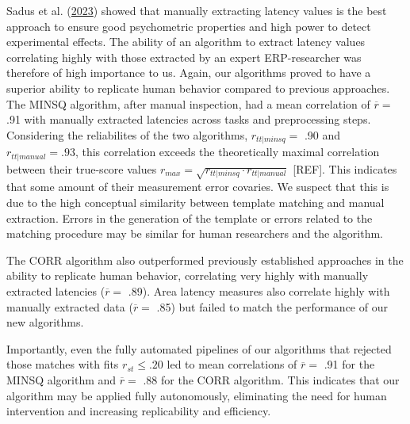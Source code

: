 \documentclass[
  man]{apa7}
\begin{document}
Sadus et al. (\protect\hyperlink{ref-sadus2023multiverse}{2023}) showed that manually extracting latency values is the best approach to ensure good psychometric properties and high power to detect experimental effects. The ability of an algorithm to extract latency values correlating highly with those extracted by an expert ERP-researcher was therefore of high importance to us.
Again, our algorithms proved to have a superior ability to replicate human behavior compared to previous approaches. The MINSQ algorithm, after manual inspection, had a mean correlation of \(\overline{r} =\) .91 with manually extracted latencies across tasks and preprocessing steps. Considering the reliabilites of the two algorithms, \(r_{tt|minsq} =\) .90 and \(r_{tt|manual} = .93\), this correlation exceeds the theoretically maximal correlation between their true-score values \(r_{max} = \sqrt{r_{tt|minsq} \cdot r_{tt|manual}}\) {[}REF{]}. This indicates that some amount of their measurement error covaries. We suspect that this is due to the high conceptual similarity between template matching and manual extraction. Errors in the generation of the template or errors related to the matching procedure may be similar for human researchers and the algorithm.

The CORR algorithm also outperformed previously established approaches in the ability to replicate human behavior, correlating very highly with manually extracted latencies (\(\overline{r} =\) .89). Area latency measures also correlate highly with manually extracted data (\(\overline{r} =\) .85) but failed to match the performance of our new algorithms.

Importantly, even the fully automated pipelines of our algorithms that rejected those matches with fits \(r_{st} \le .20\) led to mean correlations of \(\overline{r} =\) .91 for the MINSQ algorithm and \(\overline{r} =\) .88 for the CORR algorithm. This indicates that our algorithm may be applied fully autonomously, eliminating the need for human intervention and increasing replicability and efficiency.
\end{document}
